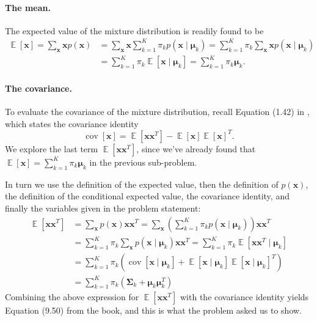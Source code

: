 \documentclass[12pt, a4paper]{article}
\newcommand{\vect}[1]{\bm{#1}}
\DeclareMathOperator{\E}{\mathbb{E}}
\DeclareMathOperator{\cov}{\operatorname{cov}}
\begin{document}
\paragraph{The mean.} The expected value of the mixture distribution is readily found to be
\begin{align*}
	\E [\vect{x}] = \sum_{\vect{x}}  \vect{x} p (\vect{x})
	& = \sum_{\vect{x}}  \vect{x} \sum_{k=1}^{K} \pi_k p (\vect{x} \mid \vect{\mu}_k)
	= \sum_{k=1}^{K} \pi_k \sum_{\vect{x}}  \vect{x}  p (\vect{x} \mid \vect{\mu}_k) \\
	&= \sum_{k=1}^{K} \pi_k \E \left[ \vect{x} \mid \vect{\mu}_k \right]
	= \sum_{k=1}^{K} \pi_k \vect{\mu}_k.
\end{align*}

\paragraph{The covariance.} To evaluate the covariance of the mixture distribution, recall Equation (1.42) in \cite{bishop_pattern_2011}, which states the covariance identity
\begin{equation*}
	\cov \left[ \vect{x}\right] = \E \left[ \vect{x} \vect{x}^T \right]
	- \E \left[ \vect{x} \right] \E \left[ \vect{x} \right]^T.
\end{equation*}
We explore the last term $\E \left[ \vect{x} \vect{x}^T \right]$, since we've already found that $\E [\vect{x}] = \sum_{k=1}^{K} \pi_k \vect{\mu}_k$ in the previous sub-problem.

In turn we use the definition of the expected value, then the definition of $p (\vect{x})$, the definition of the conditional expected value, the covariance identity, and finally the variables given in the problem statement:
\begin{align*}
	\E \left[ \vect{x} \vect{x}^T \right] &= \sum_{\vect{x}} p (\vect{x}) \vect{x} \vect{x}^T = \sum_{\vect{x}} \left( \sum_{k=1}^{K} \pi_k p (\vect{x} \mid \vect{\mu}_k) \right) \vect{x} \vect{x}^T \\
	&= \sum_{k=1}^{K} \pi_k \sum_{\vect{x}} p (\vect{x} \mid \vect{\mu}_k) \vect{x} \vect{x}^T
	= \sum_{k=1}^{K} \pi_k \E \left[ \vect{x} \vect{x}^T \mid \vect{\mu}_k \right] \\
	&= \sum_{k=1}^{K} \pi_k \left( \cov \left[ \vect{x} \mid \vect{\mu}_k \right] + \E \left[ \vect{x} \mid \vect{\mu}_k \right] \E \left[ \vect{x} \mid \vect{\mu}_k \right]^T \right) \tag{covariance identity}\\
	&= \sum_{k=1}^{K} \pi_k \left( \vect{\Sigma}_k + \vect{\mu}_k \vect{\mu}_k^T \right)
\end{align*}
Combining the above expression for $\E \left[ \vect{x} \vect{x}^T \right]$ with the covariance identity yields Equation (9.50) from the book, and this is what the problem asked us to show.
\end{document}
